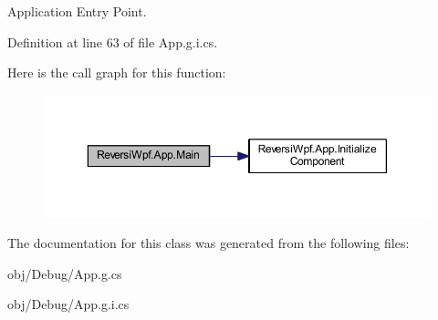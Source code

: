 Application Entry Point. 



Definition at line 63 of file App.\+g.\+i.\+cs.



Here is the call graph for this function\+:
\nopagebreak
\begin{figure}[H]
\begin{center}
\leavevmode
\includegraphics[width=350pt]{class_reversi_wpf_1_1_app_a21f38c0f40a47a04302edeeb7bf005f8_cgraph}
\end{center}
\end{figure}




The documentation for this class was generated from the following files\+:\begin{DoxyCompactItemize}
\item 
obj/\+Debug/App.\+g.\+cs\item 
obj/\+Debug/App.\+g.\+i.\+cs\end{DoxyCompactItemize}
